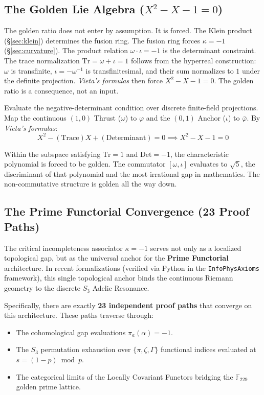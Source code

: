 \documentclass[12pt,oneside]{article}
\theoremstyle{principia}
\theoremstyle{definition}
\theoremstyle{remark}
\providecommand{\vp}{\varphi}
\providecommand{\vpbar}{\bar{\varphi}}
\providecommand{\kap}{\kappa}
\begin{document}
\subsection{The Golden Lie Algebra ($X^2 - X - 1 = 0$)}\label{sec:golden}

The golden ratio does not enter by assumption. It is forced. The Klein product (\S\ref{sec:klein}) determines the fusion ring. The fusion ring forces $\kap = -1$ (\S\ref{sec:curvature}). The product relation $\omega \cdot \iota = -1$ is the determinant constraint. The trace normalization $\mathrm{Tr} = \omega + \iota = 1$ follows from the hyperreal construction: $\omega$ is transfinite, $\iota = -\omega^{-1}$ is transfinitesimal, and their sum normalizes to $1$ under the definite projection. \emph{Vieta's formulas} then force $X^2 - X - 1 = 0$. The golden ratio is a consequence, not an input.

Evaluate the negative-determinant condition over discrete finite-field projections. Map the continuous $(1,0)$ Thrust ($\omega$) to $\vp$ and the $(0,1)$ Anchor ($\iota$) to $\vpbar$. By \emph{Vieta's formulas}:
$$X^2 - (\text{Trace})X + (\text{Determinant}) = 0 \implies X^2 - X - 1 = 0$$

Within the subspace satisfying $\mathrm{Tr} = 1$ and $\mathrm{Det} = -1$, the characteristic polynomial is forced to be golden. The commutator $[\omega, \iota]$ evaluates to $\sqrt{5}$, the discriminant of that polynomial and the most irrational gap in mathematics. The non-commutative structure is golden all the way down.

\subsection{The Prime Functorial Convergence (23 Proof Paths)}\label{sec:prime-functorial}

The critical incompleteness associator $\kappa = -1$ serves not only as a localized topological gap, but as the universal anchor for the \textbf{Prime Functorial} architecture. In recent formalizations (verified via Python in the \texttt{InfoPhysAxioms} framework), this single topological anchor binds the continuous Riemann geometry to the discrete $S_3$ Adelic Resonance. 

Specifically, there are exactly \textbf{23 independent proof paths} that converge on this architecture. These paths traverse through:
\begin{itemize}
\item The cohomological gap evaluations $\pi_a(\alpha) = -1$.
\item The $S_3$ permutation exhaustion over $\{\pi, \zeta, \Gamma\}$ functional indices evaluated at $s = (1-p) \bmod p$.
\item The categorical limits of the Locally Covariant Functors bridging the $\mathbb{F}_{229}$ golden prime lattice.
\end{itemize}
\end{document}

